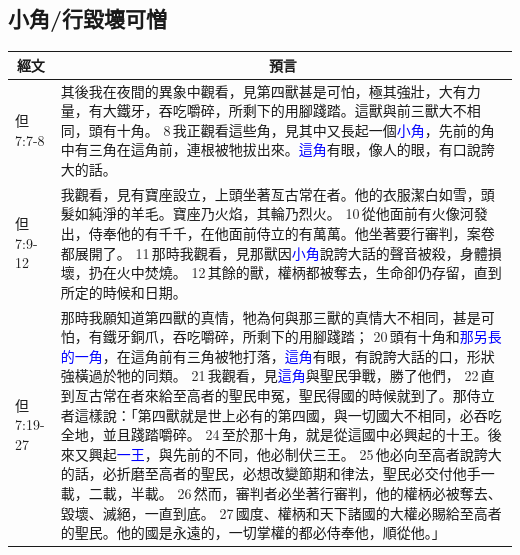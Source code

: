 \subsection{小角/行毀壞可憎}
\begin{table}[H]
\centering
\begin{tabular}{p{1.6cm}|p{15.25cm}}\hline\hline
  \multicolumn{1}{c|}{經文}&\multicolumn{1}{c}{預言}\\\hline

但7:7-8&其後我在夜間的異象中觀看，見第四獸甚是可怕，極其強壯，大有力量，有大鐵牙，吞吃嚼碎，所剩下的用腳踐踏。這獸與前三獸大不相同，頭有十角。 8 我正觀看這些角，見其中又長起一個\textcolor{blue}{小角}，先前的角中有三角在這角前，連根被牠拔出來。\textcolor{blue}{這角}有眼，像人的眼，有口說誇大的話。\\\hline

但7:9-12&我觀看，見有寶座設立，上頭坐著亙古常在者。他的衣服潔白如雪，頭髮如純淨的羊毛。寶座乃火焰，其輪乃烈火。 10 從他面前有火像河發出，侍奉他的有千千，在他面前侍立的有萬萬。他坐著要行審判，案卷都展開了。 11 那時我觀看，見那獸因\textcolor{blue}{小角}說誇大話的聲音被殺，身體損壞，扔在火中焚燒。 12 其餘的獸，權柄都被奪去，生命卻仍存留，直到所定的時候和日期。\\\hline

但7:19-27&那時我願知道第四獸的真情，牠為何與那三獸的真情大不相同，甚是可怕，有鐵牙銅爪，吞吃嚼碎，所剩下的用腳踐踏； 20 頭有十角和\textcolor{blue}{那另長的一角}，在這角前有三角被牠打落，\textcolor{blue}{這角}有眼，有說誇大話的口，形狀強橫過於牠的同類。 21 我觀看，見\textcolor{blue}{這角}與聖民爭戰，勝了他們， 22 直到亙古常在者來給至高者的聖民申冤，聖民得國的時候就到了。那侍立者這樣說：「第四獸就是世上必有的第四國，與一切國大不相同，必吞吃全地，並且踐踏嚼碎。 24 至於那十角，就是從這國中必興起的十王。後來又興起\textcolor{blue}{一王}，與先前的不同，他必制伏三王。 25 他必向至高者說誇大的話，必折磨至高者的聖民，必想改變節期和律法，聖民必交付他手一載，二載，半載。 26 然而，審判者必坐著行審判，他的權柄必被奪去、毀壞、滅絕，一直到底。 27 國度、權柄和天下諸國的大權必賜給至高者的聖民。他的國是永遠的，一切掌權的都必侍奉他，順從他。」\\\hline


\end{tabular}
\end{table}
